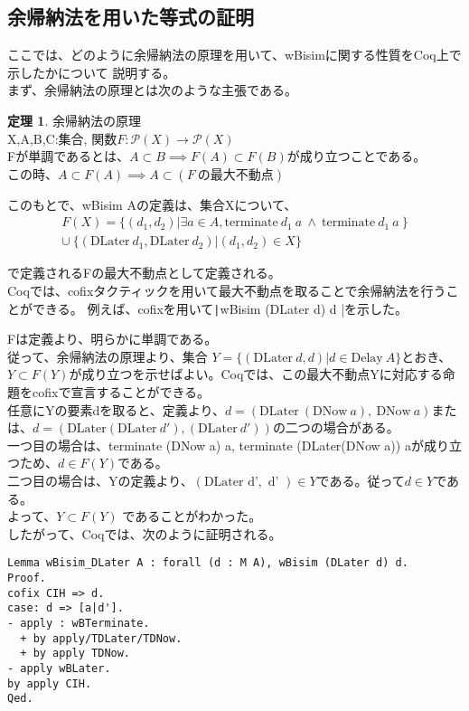 \documentclass[japanese]{jssst_ppl}
\theoremstyle{definition}
\newtheorem{theorem}{定理}
\begin{document}
\subsection{余帰納法を用いた等式の証明}
ここでは、どのように余帰納法の原理を用いて、wBisimに関する性質をCoq上で示したかについて
説明する。\\
まず、余帰納法の原理とは次のような主張である。
\begin{theorem}{余帰納法の原理\\}
  X,A,B,C:集合,
  関数$F:\mathcal{P}(X) \to \mathcal{P}(X)$\\
  Fが単調であるとは、$A \subset B \implies F(A) \subset F(B)$が成り立つことである。\\
  この時、$A \subset F(A) \implies A \subset (F \ \text{の最大不動点})$
\end{theorem}
このもとで、wBisim Aの定義は、集合Xについて、
\begin{align*}
  F(X) = \{ (d_1, d_2) | \exists a \in A, \text{terminate} \ d_1 \ a \ \land \ \text{terminate} \ d_1 \ a \ \} \\
  \cup \ \{ (\text{DLater} \ d_1, \text{DLater} \  d_2) | (d_1, d_2) \in X\}
\end{align*}


で定義されるFの最大不動点として定義される。\\
Coqでは、cofixタクティックを用いて最大不動点を取ることで余帰納法を行うことができる。
例えば、cofixを用いて\texttt|wBisim (DLater d) d |を示した。

Fは定義より、明らかに単調である。\\
従って、余帰納法の原理より、集合 $Y = \{ (\text{DLater} \ d, d) | d \in \text{Delay} \ A \} $とおき、
$Y \subset F (Y) $が成り立つを示せばよい。Coqでは、この最大不動点Yに対応する命題をcofixで宣言することができる。\\
任意にYの要素dを取ると、定義より、$d = (\text{DLater} \ (\text{DNow} \ a), \ \text{DNow} \ a)$または、$d = (\text{DLater} (\text{DLater} \ d'), (\text{DLater} \ d'))$の二つの場合がある。\\
一つ目の場合は、terminate (DNow a) a, terminate (DLater(DNow a)) aが成り立つため、$d \in F(Y)$である。\\
二つ目の場合は、Yの定義より、$ ( \text{DLater d'}, \text{ d' } ) \in Y$である。従って$ d \in Y $である。\\
よって、$Y \subset F (Y)$ であることがわかった。\\
したがって、Coqでは、次のように証明される。
\begin{verbatim}
Lemma wBisim_DLater A : forall (d : M A), wBisim (DLater d) d.
Proof.
cofix CIH => d.
case: d => [a|d'].
- apply : wBTerminate.
  + by apply/TDLater/TDNow.
  + by apply TDNow.
- apply wBLater.
by apply CIH.
Qed.
\end{verbatim}
\end{document}
